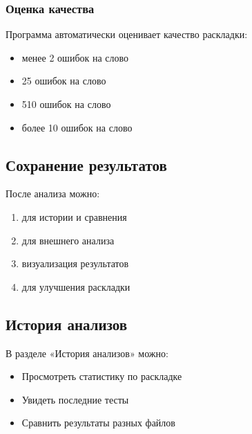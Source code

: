 \documentclass[a4paper,11pt,russian,openany,oneside]{sphinxmanual}
\begin{document}
\subsubsection{Оценка качества}
\label{\detokenize{usage:id12}}
\sphinxAtStartPar
Программа автоматически оценивает качество раскладки:
\begin{itemize}
\item {} 
\sphinxAtStartPar
{} \sphinxhyphen{} менее 2 ошибок на слово

\item {} 
\sphinxAtStartPar
{} \sphinxhyphen{} 2\sphinxhyphen{}5 ошибок на слово

\item {} 
\sphinxAtStartPar
{} \sphinxhyphen{} 5\sphinxhyphen{}10 ошибок на слово

\item {} 
\sphinxAtStartPar
{} \sphinxhyphen{} более 10 ошибок на слово

\end{itemize}


\subsection{Сохранение результатов}
\label{\detokenize{usage:id13}}
\sphinxAtStartPar
После анализа можно:
\begin{enumerate}
%
\item {} 
\sphinxAtStartPar
{} \sphinxhyphen{} для истории и сравнения

\item {} 
\sphinxAtStartPar
{} \sphinxhyphen{} для внешнего анализа

\item {} 
\sphinxAtStartPar
{} \sphinxhyphen{} визуализация результатов

\item {} 
\sphinxAtStartPar
{} \sphinxhyphen{} для улучшения раскладки

\end{enumerate}


\subsection{История анализов}
\label{\detokenize{usage:id14}}
\sphinxAtStartPar
В разделе «История анализов» можно:
\begin{itemize}
\item {} 
\sphinxAtStartPar
Просмотреть статистику по раскладке

\item {} 
\sphinxAtStartPar
Увидеть последние тесты

\item {} 
\sphinxAtStartPar
Сравнить результаты разных файлов

\end{itemize}
\end{document}
